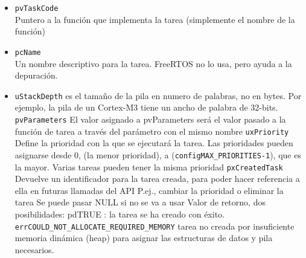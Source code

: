 \begin{itemize}
	\item \lstinline|pvTaskCode|\\
Puntero a la función que implementa la tarea (simplemente el nombre de la función)
	\item \lstinline|pcName|\\
Un nombre descriptivo para la tarea. FreeRTOS no lo usa, pero ayuda a la depuración.
	\item \lstinline|uStackDepth| es el tamaño de la pila en numero de palabras, no en bytes.
Por ejemplo, la pila de un Cortex-M3 tiene un ancho de palabra de 32-bits.
\lstinline|pvParameters|
El valor asignado a pvParameters será el valor pasado a la función de tarea a través del parámetro con el mismo nombre
\lstinline|uxPriority|
Define la prioridad con la que se ejecutará la tarea.
Las prioridades pueden asignarse desde 0, (la menor prioridad), a (\lstinline|configMAX_PRIORITIES-1|), que es la mayor.
Varias tareas pueden tener la misma prioridad
\lstinline|pxCreatedTask|
Devuelve un identificador para la tarea creada, para poder hacer referencia a ella en futuras llamadas del API
P.ej., cambiar la prioridad o eliminar la tarea
Se puede pasar NULL si no se va a usar
Valor de retorno, dos posibilidades:
pdTRUE : la tarea se ha creado con éxito.
\lstinline|errCOULD_NOT_ALLOCATE_REQUIRED_MEMORY|
tarea no creada por insuficiente memoria dinámica (heap) para asignar las estructuras de datos y pila necesarios.

\end{itemize}
\section{}